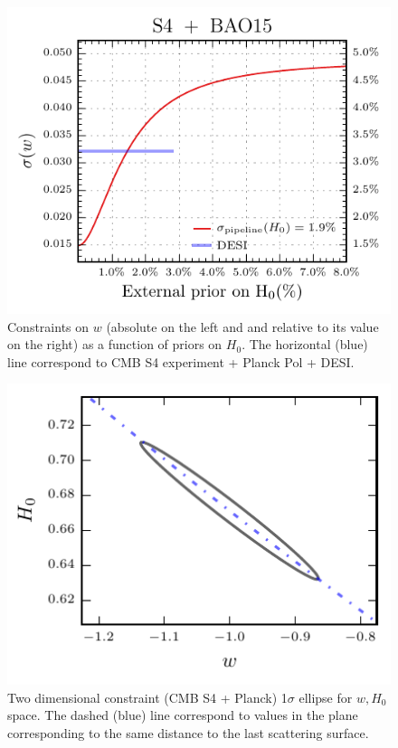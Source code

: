 \documentclass[aps,prd,reprint,superscriptaddress,nofootinbib,floatfix]{revtex4-1}
\begin{document}
\begin{figure}[htbp]
\begin{center}
\includegraphics{prior_w_hubble}
\caption{Constraints on $w$ (absolute on the left and and relative to its value on the right) as a function of priors on $H_{0}$. The horizontal (blue) line correspond to CMB S4 experiment + Planck Pol + DESI.}
\label{fig:prior_w-h}
\end{center}
\end{figure}


\begin{figure}[htbp]
\begin{center}
\includegraphics{ellipse_H0_w.pdf}
\caption{Two dimensional constraint (CMB S4 + Planck) 1$\sigma$ ellipse for $w,H_{0}$ space. The dashed (blue) line correspond to values in the plane corresponding to the same distance to the last scattering surface.} 
\label{fig:ellipse_w_H0}
\end{center}
\end{figure}
\end{document}
